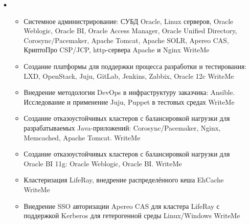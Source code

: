\documentclass[11pt,a4paper,sans]{moderncv}        %
\begin{document}
{\begin{itemize}
\begin{itemize}
				{Сопровождение СУБД Oracle и Oracle Exadata для аналитических систем и хранилищ данных}
				{Maintain Oracle RDBMS for datawarehouses and business analytic systems}
			\item {}
				{Анализ производительности и настройка СУБД Oracle, Oracle Exadata}
				{Analyzed and tuned Oracle database perfomance}
			\item {}
				{Мониторинг СУБД с помощью Oracle Enterprise Manager}
				{Installed and maintained database monitoring system: Oracle Enterprise Manager}
			\item {}
				{Оптимизация SQL-запросов}
				{Optimized SQL-query}
			\item {}
				{Анализ производительности и настройка Linux-серверов для СУБД Oracle}
				{Analyzed and tuned Linux servers perfomance for Oracle RDBMS}
		\end{itemize}
	\item {}
		\begin{itemize}
			\item {}
				{Системное администрирование: СУБД Oracle, Linux серверов, Oracle Weblogic, Oracle BI, Oracle Access Manager, Oracle Unified Directory,
				Corosync/Pacemaker, Apache Tomcat, Apache SOLR, Apereo CAS, КриптоПро CSP/JCP, http-сервера Apache и Nginx}
				{WriteMe}
			\item {}
				{Создание платформы для поддержки процесса разработки и тестирования: LXD, OpenStack, Juju, GitLab, Jenkins, Zabbix, Oracle 12c}
				{WriteMe}
			\item {}
				{Внедрение методологии DevOps в инфраструктуру заказчика: Ansible. Исследование и применение Juju, Puppet в тестовых средах}
				{WriteMe}
			\item {}
				{Создание отказоустойчивых кластеров с балансировкой нагрузки для разрабатываемых Java-приложений: Corosync/Pacemaker, Nginx, Memcached, Apache Tomcat.}
				{WriteMe}
			\item {}
				{Создание отказоустойчивых кластеров с балансировкой нагрузки для Oracle BI 11g: Oracle Weblogic, Oracle BI.}
				{WriteMe}
			\item {}
				{Кластеризация LifeRay, внедрение распределённого кеша EhCache}
				{WriteMe}
			\item {}
				{Внедрение SSO авторизации Apereo CAS для кластера LifeRay с поддержкой Kerberos для гетерогенной среды Linux/Windows}
				{WriteMe}
		\end{itemize}
	\end{itemize}
}
\end{document}
